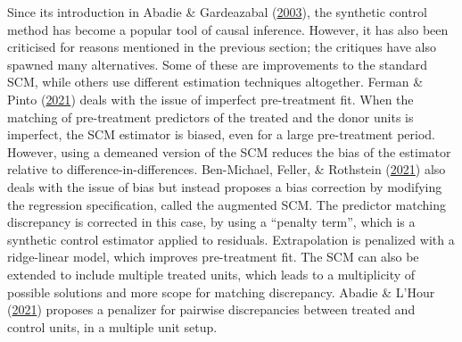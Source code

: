 \documentclass[12pt,nobind, a4paper]{reedthesis}
\begin{document}
 Since its introduction in Abadie \& Gardeazabal (\protect\hyperlink{ref-abadie_economic_2003}{2003}), the synthetic control method has become a popular tool of causal inference. However, it has also been criticised for reasons mentioned in the previous section; the critiques have also spawned many alternatives. Some of these are improvements to the standard SCM, while others use different estimation techniques altogether. Ferman \& Pinto (\protect\hyperlink{ref-ferman_synthetic_2021}{2021}) deals with the issue of imperfect pre-treatment fit. When the matching of pre-treatment predictors of the treated and the donor units is imperfect, the SCM estimator is biased, even for a large pre-treatment period. However, using a demeaned version of the SCM reduces the bias of the estimator relative to difference-in-differences. Ben-Michael, Feller, \& Rothstein (\protect\hyperlink{ref-ben-michael_augmented_2021}{2021}) also deals with the issue of bias but instead proposes a bias correction by modifying the regression specification, called the augmented SCM. The predictor matching discrepancy is corrected in this case, by using a ``penalty term'', which is a synthetic control estimator applied to residuals. Extrapolation is penalized with a ridge-linear model, which improves pre-treatment fit. The SCM can also be extended to include multiple treated units, which leads to a multiplicity of possible solutions and more scope for matching discrepancy. Abadie \& L'Hour (\protect\hyperlink{ref-abadie_penalized_2021}{2021}) proposes a penalizer for pairwise discrepancies between treated and control units, in a multiple unit setup.
 \linebreak
\end{document}

